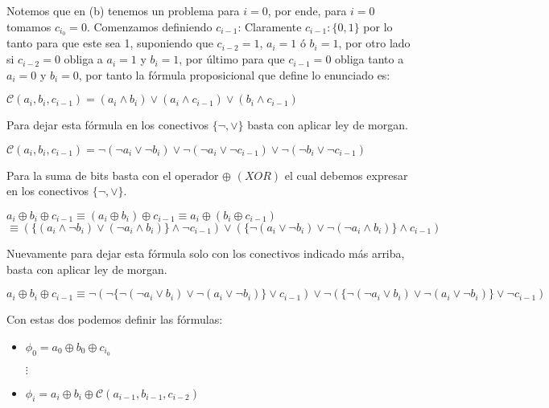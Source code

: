 \documentclass[10pt]{article}
\begin{document}
\begin{enumerate}
    Notemos que en (b) tenemos un problema para $i=0$, por ende, para $i=0$ tomamos $c_{i_{0}}=0$. Comenzamos definiendo 
    $c_{i-1}$: Claramente $c_{i-1}:\{0,1\}$ por lo tanto para que este sea 1, suponiendo que $c_{i-2}=1$,
    $a_{i}=1$ ó $b_{i}=1$, por otro lado si $c_{i-2}=0$ obliga a $a_i=1$ y $b_i=1$, por último para que $c_{i-1}=0$ obliga tanto a 
    $a_i=0$ y $b_i=0$, por tanto la fórmula proposicional que define lo enunciado es:


    \begin{center}
        $\mathcal{C}(a_i, b_i, c_{i-1})=(a_i\wedge b_i)\vee(a_i\wedge c_{i-1})\vee(b_i\wedge c_{i-1})$ 
    \end{center}
    Para dejar esta fórmula en los conectivos $\{\neg, \vee\}$ basta con aplicar ley de morgan.
    \begin{center}
        $\mathcal{C}(a_i, b_i, c_{i-1})=\neg(\neg a_i\vee \neg b_i)\vee\neg(\neg a_i\vee \neg c_{i-1})\vee\neg(\neg b_i\vee \neg c_{i-1})$ \\
    \end{center}

    Para la suma de bits basta con el operador $\oplus$ $(XOR)$ el cual debemos expresar en los conectivos $\{\neg,\vee\}$.
    \begin{center}
        $a_i\oplus b_i\oplus c_{i-1}\equiv (a_i\oplus b_i)\oplus c_{i-1}\equiv a_i\oplus(b_i\oplus c_{i-1})$\\
        $\equiv (\{(a_i\wedge\neg b_i)\vee(\neg a_i\wedge b_i)\}\wedge \neg c_{i-1})\vee(\{\neg(a_i\vee\neg b_i)\vee\neg(\neg a_i\wedge b_i)\}\wedge c_{i-1})$
    \end{center}
    Nuevamente para dejar esta fórmula solo con los conectivos indicado más arriba, basta con aplicar ley de morgan.
    \begin{center}
        $a_i\oplus b_i\oplus c_{i-1}\equiv\neg(\neg\{\neg(\neg a_i\vee b_i)\vee\neg(a_i\vee\neg b_i)\}\vee c_{i-1})\vee\neg(\{\neg(\neg a_i\vee b_i)\vee\neg(a_i\vee\neg b_i)\}\vee\neg c_{i-1})$
    \end{center}
    Con estas dos podemos definir las fórmulas:
    \begin{itemize}
        \item $\phi_0=a_0\oplus b_0 \oplus c_{i_0}$
        
        \hspace{0.55cm}$\vdots$

        \item $\phi_i=a_i\oplus b_i \oplus \mathcal{C}(a_{i-1},b_{i-1},c_{i-2})$
        

\end{itemize}
\end{enumerate}
\end{document}
